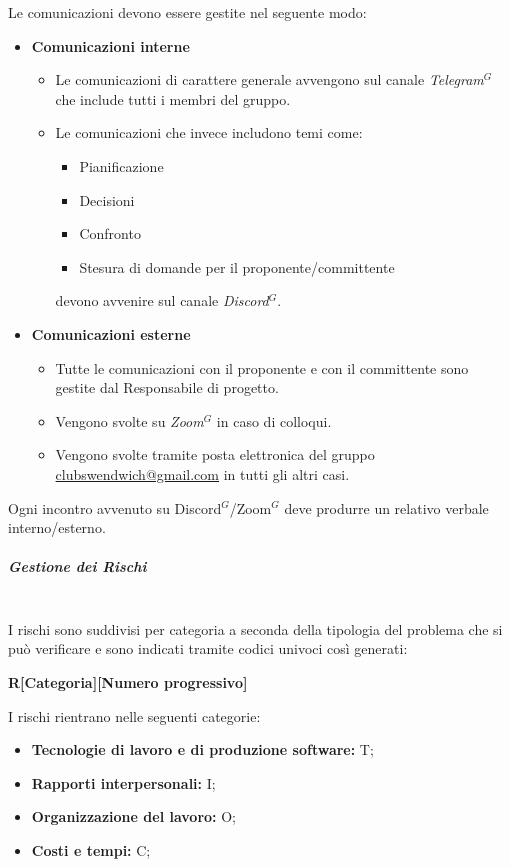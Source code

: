 Le comunicazioni devono essere gestite nel seguente modo:
\begin{itemize}
    \item \textbf{Comunicazioni interne}
    \begin{itemize}
        \item Le comunicazioni di carattere generale avvengono sul canale \textit{Telegram}$^{G}$
        che include tutti i membri del gruppo.
        \item Le comunicazioni che invece includono temi come:
        \begin{itemize}
            \item Pianificazione
            \item Decisioni
            \item Confronto
            \item Stesura di domande per il proponente/committente
        \end{itemize}
        devono avvenire sul canale \textit{Discord}$^{G}$.
    \end{itemize}
    \item \textbf{Comunicazioni esterne}
    \begin{itemize}
        \item Tutte le comunicazioni con il proponente e con il committente sono gestite dal Responsabile di progetto.
        \item Vengono svolte su \textit{Zoom}$^{G}$ in caso di colloqui.
        \item Vengono svolte tramite posta elettronica del gruppo \href{mailto:clubswendwich@gmail.com}{clubswendwich@gmail.com} in tutti gli altri casi.
    \end{itemize}
\end{itemize}

Ogni incontro avvenuto su Discord$^{G}$/Zoom$^{G}$ deve produrre un relativo verbale interno/esterno.

\subparagraph{Gestione dei Rischi}
\mbox{}\\
I rischi sono suddivisi per categoria a seconda della tipologia del problema che si può verificare e
sono indicati tramite codici univoci così generati:

\begin{center}
    \textbf{R[Categoria][Numero progressivo]}
\end{center}

I rischi rientrano nelle seguenti categorie:
\begin{itemize}
    \item \textbf{Tecnologie di lavoro e di produzione software:} T;
    \item \textbf{Rapporti interpersonali:} I;
    \item \textbf{Organizzazione del lavoro:} O;
    \item \textbf{Costi e tempi:} C;
\end{itemize}


